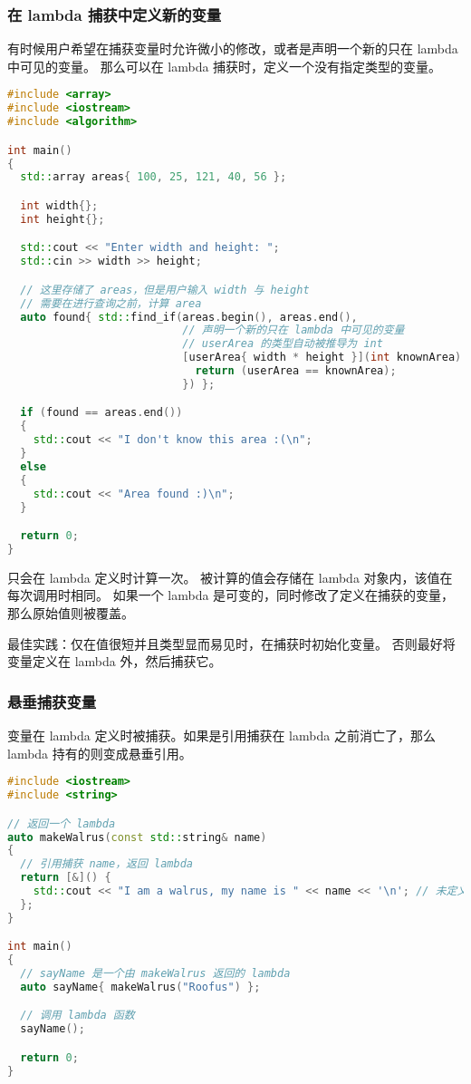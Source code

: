 \documentclass[../../LearnCpp.tex]{subfiles}
\begin{document}
\subsubsection*{在 lambda 捕获中定义新的变量}

有时候用户希望在捕获变量时允许微小的修改，或者是声明一个新的只在 lambda 中可见的变量。
那么可以在 lambda 捕获时，定义一个没有指定类型的变量。

\begin{lstlisting}[language=C++]
#include <array>
#include <iostream>
#include <algorithm>

int main()
{
  std::array areas{ 100, 25, 121, 40, 56 };

  int width{};
  int height{};

  std::cout << "Enter width and height: ";
  std::cin >> width >> height;

  // 这里存储了 areas，但是用户输入 width 与 height
  // 需要在进行查询之前，计算 area
  auto found{ std::find_if(areas.begin(), areas.end(),
                           // 声明一个新的只在 lambda 中可见的变量
                           // userArea 的类型自动被推导为 int
                           [userArea{ width * height }](int knownArea) {
                             return (userArea == knownArea);
                           }) };

  if (found == areas.end())
  {
    std::cout << "I don't know this area :(\n";
  }
  else
  {
    std::cout << "Area found :)\n";
  }

  return 0;
}
\end{lstlisting}

 只会在 lambda 定义时计算一次。
被计算的值会存储在 lambda 对象内，该值在每次调用时相同。
如果一个 lambda 是可变的，同时修改了定义在捕获的变量，那么原始值则被覆盖。

最佳实践：仅在值很短并且类型显而易见时，在捕获时初始化变量。
否则最好将变量定义在 lambda 外，然后捕获它。

\subsubsection*{悬垂捕获变量}

变量在 lambda 定义时被捕获。如果是引用捕获在 lambda 之前消亡了，那么 lambda 持有的则变成悬垂引用。

\begin{lstlisting}[language=C++]
#include <iostream>
#include <string>

// 返回一个 lambda
auto makeWalrus(const std::string& name)
{
  // 引用捕获 name，返回 lambda
  return [&]() {
    std::cout << "I am a walrus, my name is " << name << '\n'; // 未定义行为
  };
}

int main()
{
  // sayName 是一个由 makeWalrus 返回的 lambda
  auto sayName{ makeWalrus("Roofus") };

  // 调用 lambda 函数
  sayName();

  return 0;
}
\end{lstlisting}
\end{document}

